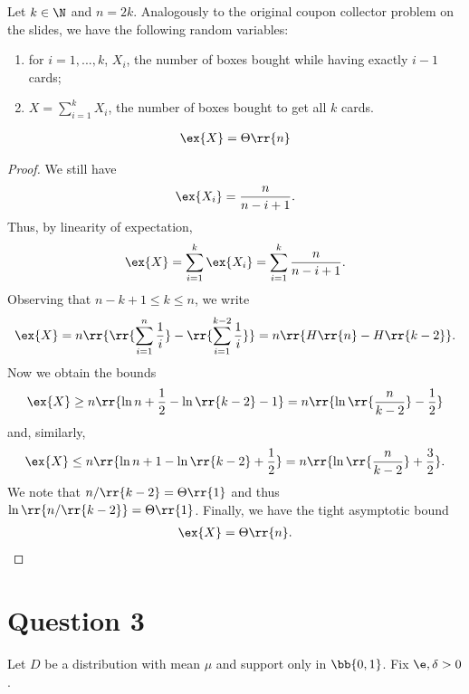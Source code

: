 \documentclass{article}
\begin{document}
Let $k\in\N$ and $n=2k$. Analogously to the original coupon collector problem on the slides, we have the following
random variables:
\begin{enumerate}
  \item for $i=1,...,k$, $X_i$, the number of boxes bought while having exactly $i-1$ cards;
  \item $X=\sum_{i=1}^{k} X_i$, the number of boxes bought to get all $k$ cards.
\end{enumerate}

\begin{claim*}
  \begin{align*}
    \ex{X}=\Theta\rr{n}
  \end{align*}
  \begin{proof}
    We still have
    \begin{align*}
      \ex{X_i}=\frac{n}{n-i+1}.
    \end{align*}
    Thus, by linearity of expectation,
    \begin{align*}
      \ex{X}=\sum_{i=1}^{k} \ex{X_i} = \sum_{i=1}^{k} \frac{n}{n-i+1}.
    \end{align*}
    Observing that $n-k+1\leq k\leq n$, we write
    \begin{align*}
      \ex{X}=n\rr{\rr{\sum_{i=1}^{n} \frac{1}{i}} - \rr{\sum_{i=1}^{k-2} \frac{1}{i}}} = n\rr{H\rr{n}-H\rr{k-2}}.
    \end{align*}
    Now we obtain the bounds
    \begin{align*}
      \ex{X} \geq n\rr{\ln n + \frac{1}{2} - \ln\rr{k-2} - 1} = n\rr{\ln\rr{\frac{n}{k-2}}-\frac{1}{2}}
    \end{align*}
    and, similarly,
    \begin{align*}
      \ex{X} \leq n\rr{\ln n + 1 - \ln\rr{k-2}+\frac{1}{2}} = n\rr{\ln\rr{\frac{n}{k-2}}+\frac{3}{2}}.
    \end{align*}
    We note that $n/\rr{k-2}=\Theta\rr{1}$ and thus $\ln\rr{n/\rr{k-2}}=\Theta\rr{1}$.
    Finally, we have the tight asymptotic bound
    \begin{align*}
      \ex{X}=\Theta\rr{n}.
    \end{align*}
  \end{proof}
\end{claim*}

\section*{Question 3}

Let $D$ be a distribution with mean $\mu$ and support only in $\bb{0,1}$. Fix $\e,\delta>0$.
\end{document}
